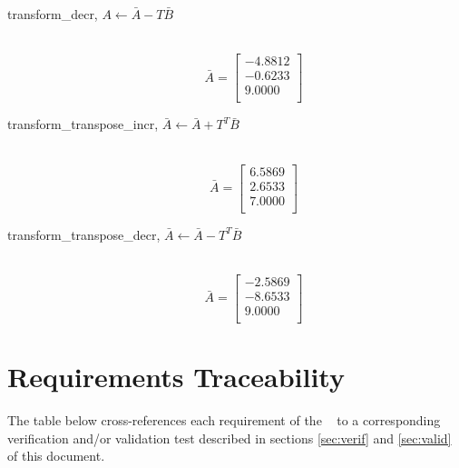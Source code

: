 \begin{description}
  \item[transform\_decr, $A\leftarrow\bar{A}-T\bar{B}$]\ \newline
   \begin{equation}\nonumber
   \bar{A} = \left[
   \begin{array}{r}
     -4.8812 \\
     -0.6233 \\
      9.0000 \\
   \end{array}\right]
   \end{equation}

  \item[transform\_transpose\_incr, $\bar{A}\leftarrow\bar{A}+T^T\bar{B}$]\ \newline
   \begin{equation}\nonumber
   \bar{A} = \left[
   \begin{array}{r}
      6.5869 \\
      2.6533 \\
      7.0000 \\
   \end{array}\right]
   \end{equation}

  \item[transform\_transpose\_decr, $\bar{A}\leftarrow\bar{A}-T^T\bar{B}$]\ \newline
   \begin{equation}\nonumber
   \bar{A} = \left[
   \begin{array}{r}
     -2.5869 \\
     -8.6533 \\
      9.0000 \\
   \end{array}\right]
   \end{equation}

\end{description}




\section{Requirements Traceability}\label{sec:traceability}
The table below cross-references each requirement of the 
\mathDesc\ 
to a corresponding verification and/or validation test
described in sections \ref{sec:verif} and \ref{sec:valid} of this document. 

